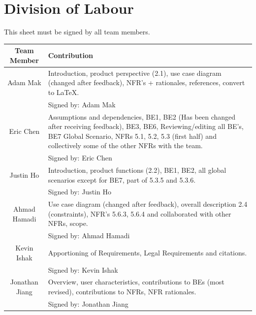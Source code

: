 \documentclass[]{article}
\begin{document}
\section{Division of Labour}
\label{sec:division_of_labour}
This sheet must be signed by all team members.
\begin{center} \begin{tabular} {|c|p{35em}|}
	\hline
	\textbf{Team Member} & \textbf{Contribution} \\
	\hline \hline
	Adam Mak & Introduction, product perspective (2.1), use case diagram (changed after feedback), NFR's + rationales, references, convert to LaTeX. \\
	& Signed by: Adam Mak \\
	\hline
	Eric Chen & Assumptions and dependencies, BE1, BE2 (Has been changed after receiving feedback), BE3, BE6, Reviewing/editing all BE's, BE7 Global Scenario, NFRs 5.1, 5.2, 5.3 (first half) and collectively some of the other NFRs with the team. \\
	& Signed by: Eric Chen \\
	\hline
	Justin Ho & Introduction, product functions (2.2), BE1, BE2, all global scenarios except for BE7, part of 5.3.5 and 5.3.6. \\
	& Signed by: Justin Ho \\
	\hline
	Ahmad Hamadi & Use case diagram (changed after feedback), overall description 2.4 (constraints), NFR's 5.6.3, 5.6.4 and collaborated with other NFRs, scope. \\
	& Signed by: Ahmad Hamadi \\
	\hline
	Kevin Ishak & Apportioning of Requirements, Legal Requirements and citations. \\
	& Signed by: Kevin Ishak \\
	\hline
	Jonathan Jiang & Overview, user characteristics, contributions to BEs (most revised), contributions to NFRs, NFR rationales. \\
	& Signed by: Jonathan Jiang \\
	\hline
\end{tabular} \end{center}
\end{document}

